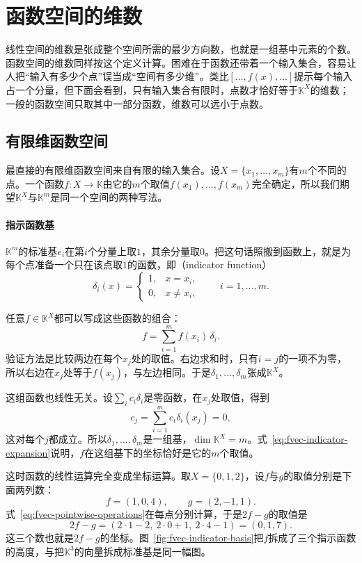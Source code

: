 \section{函数空间的维数}
\label{sec:fvec-dimension}

线性空间的维数是张成整个空间所需的最少方向数，也就是一组基中元素的个数。函数空间的维数同样按这个定义计算。困难在于函数还带着一个输入集合，容易让人把“输入有多少个点”误当成“空间有多少维”。类比$[\ldots,f(x),\ldots]$提示每个输入占一个分量，但下面会看到，只有输入集合有限时，点数才恰好等于$\mathbb K^X$的维数；一般的函数空间只取其中一部分函数，维数可以远小于点数。

\subsection{有限维函数空间}
\label{sec:fvec-finite-dimensional}

最直接的有限维函数空间来自有限的输入集合。设$X=\{x_1,\ldots,x_m\}$有$m$个不同的点。一个函数$f:X\to\mathbb K$由它的$m$个取值$f(x_1),\ldots,f(x_m)$完全确定，所以我们期望$\mathbb K^X$与$\mathbb K^m$是同一个空间的两种写法。

\paragraph{指示函数基}
$\mathbb K^m$的标准基$e_i$在第$i$个分量上取$1$，其余分量取$0$。把这句话照搬到函数上，就是为每个点准备一个只在该点取$1$的函数，即（indicator function）
\[
 \delta_i(x)=\begin{cases}1,&x=x_i,\\0,&x\neq x_i,\end{cases}\qquad i=1,\ldots,m.
\]

任意$f\in\mathbb K^X$都可以写成这些函数的组合：
\begin{equation}
 f=\sum_{i=1}^mf(x_i)\,\delta_i.
 \label{eq:fvec-indicator-expansion}
\end{equation}
验证方法是比较两边在每个$x_j$处的取值。右边求和时，只有$i=j$的一项不为零，所以右边在$x_j$处等于$f(x_j)$，与左边相同。于是$\delta_1,\ldots,\delta_m$张成$\mathbb K^X$。

这组函数也线性无关。设$\sum_ic_i\delta_i$是零函数，在$x_j$处取值，得到
\[
 c_j=\sum_{i=1}^mc_i\delta_i(x_j)=0,
\]
这对每个$j$都成立。所以$\delta_1,\ldots,\delta_m$是一组基，$\dim\mathbb K^X=m$。式~\eqref{eq:fvec-indicator-expansion}说明，$f$在这组基下的坐标恰好是它的$m$个取值。

这时函数的线性运算完全变成坐标运算。取$X=\{0,1,2\}$，设$f$与$g$的取值分别是下面两列数：
\[
 f=(1,0,4),\qquad g=(2,-1,1).
\]
式~\eqref{eq:fvec-pointwise-operations}在每点分别计算，于是$2f-g$的取值是
\[
 2f-g=(2\cdot1-2,\ 2\cdot0+1,\ 2\cdot4-1)=(0,1,7).
\]
这三个数也就是$2f-g$的坐标。图~\ref{fig:fvec-indicator-basis}把$f$拆成了三个指示函数的高度，与把$\mathbb K^3$的向量拆成标准基是同一幅图。

